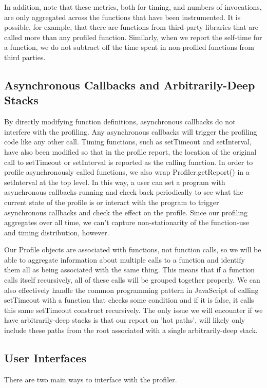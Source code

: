 \documentclass[11pt]{article}
\begin{document}
In addition, note that these metrics, both for timing, and
numbers of invocations, are only aggregated across the functions that
have been instrumented. It is possible, for example, that there are
functions from third-party libraries that are called more than any
profiled function. Similarly, when we report the self-time for a
function, we do not subtract off the time spent in non-profiled
functions from third parties. 


\subsection{Asynchronous Callbacks and Arbitrarily-Deep Stacks}
	By directly modifying function definitions, asynchronous callbacks do not interfere with 
the profiling. Any asynchronous callbacks will trigger the profiling code like any other call. 
Timing functions, such as setTimeout and setInterval, have also been modified so 
that in the profile report, the location of the original call to setTimeout or setInterval 
is reported as the calling function. In order to profile
asynchronously called functions, we also wrap Profiler.getReport() in
a setInterval at the top level.  In this way, a user can set a program
with asynchronous callbacks running and check back periodically to see
what the current state of the profile is or interact with the program
to trigger asynchronous  callbacks and check the effect on the
profile. Since our profiling aggregates over all time, we can't
capture non-stationarity of the function-use and timing distribution, however. 

Our Profile objects are associated with functions, not function calls,
so we will be able to aggregate information about multiple calls to a
function and identify them all as being associated with the same
thing. This means that  if a function calls itself recursively, all of
these calls will be grouped together properly. We can also effectively
handle the common programming pattern in JavaScript of calling
setTimeout with a function that checks some condition and if it is
false, it calls this same setTimeout construct recursively. The only issue we will
encounter if we have arbitrarily-deep stacks is that our report on
'hot paths', will likely only include these paths from the root
associated with a single arbitrarily-deep stack. 

\subsection{User Interfaces}
There are two main ways to interface with the profiler. 
\end{document}
